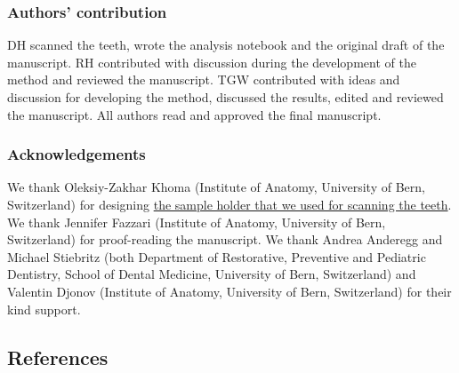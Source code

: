 \documentclass[
  american,
]{article}
\begin{document}
\hypertarget{authors-contribution}{%
\subsubsection{Authors' contribution}\label{authors-contribution}}

DH scanned the teeth, wrote the analysis notebook and the original draft of the manuscript.
RH contributed with discussion during the development of the method and reviewed the manuscript.
TGW contributed with ideas and discussion for developing the method, discussed the results, edited and reviewed the manuscript.
All authors read and approved the final manuscript.

\hypertarget{acknowledgements}{%
\subsubsection{Acknowledgements}\label{acknowledgements}}

We thank Oleksiy-Zakhar Khoma (Institute of Anatomy, University of Bern, Switzerland) for designing \href{https://github.com/TomoGraphics/Hol3Drs/blob/master/STL/tooth_holder3.stl}{the sample holder that we used for scanning the teeth}.
We thank Jennifer Fazzari (Institute of Anatomy, University of Bern, Switzerland) for proof-reading the manuscript.
We thank Andrea Anderegg and Michael Stiebritz (both Department of Restorative, Preventive and Pediatric Dentistry, School of Dental Medicine, University of Bern, Switzerland) and Valentin Djonov (Institute of Anatomy, University of Bern, Switzerland) for their kind support.

\hypertarget{references}{%
\subsection{References}\label{references}}
\end{document}
